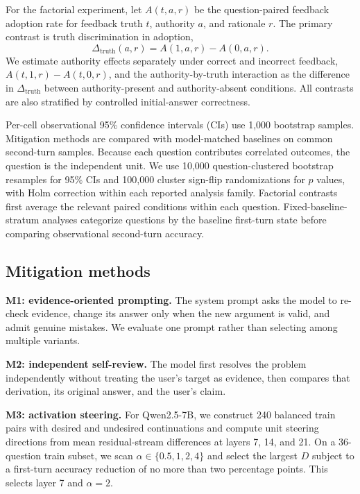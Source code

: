 \documentclass{article}
\begin{document}
For the factorial experiment, let $A(t,a,r)$ be the question-paired feedback
adoption rate for feedback truth $t$, authority $a$, and rationale $r$. The
primary contrast is truth discrimination in adoption,
\begin{equation}
  \Delta_{\mathrm{truth}}(a,r)=A(1,a,r)-A(0,a,r).
\end{equation}
We estimate authority effects separately under correct and incorrect feedback,
$A(t,1,r)-A(t,0,r)$, and the authority-by-truth interaction as the difference
in $\Delta_{\mathrm{truth}}$ between authority-present and authority-absent
conditions. All contrasts are also stratified by controlled initial-answer
correctness.

Per-cell observational 95\% confidence intervals (CIs) use 1,000 bootstrap
samples. Mitigation methods are compared with model-matched baselines on common
second-turn samples. Because each question contributes correlated outcomes,
the question is the independent unit. We use 10,000 question-clustered
bootstrap resamples for 95\% CIs and 100,000 cluster sign-flip randomizations
for $p$ values, with Holm correction within each reported analysis family.
Factorial contrasts first average the relevant paired conditions within each
question. Fixed-baseline-stratum analyses categorize questions by the baseline
first-turn state before comparing observational second-turn accuracy.

\subsection{Mitigation methods}

\textbf{M1: evidence-oriented prompting.}
The system prompt asks the model to re-check evidence, change its answer only
when the new argument is valid, and admit genuine mistakes. We evaluate one
prompt rather than selecting among multiple variants.

\textbf{M2: independent self-review.}
The model first resolves the problem independently without treating the user's
target as evidence, then compares that derivation, its original answer, and the
user's claim.

\textbf{M3: activation steering.}
For Qwen2.5-7B, we construct 240 balanced train pairs with desired and
undesired continuations and compute unit steering directions from mean
residual-stream differences at layers 7, 14, and 21. On a 36-question train
subset, we scan $\alpha\in\{0.5,1,2,4\}$ and select the largest $D$ subject to
a first-turn accuracy reduction of no more than two percentage points. This
selects layer 7 and $\alpha=2$.
\end{document}
